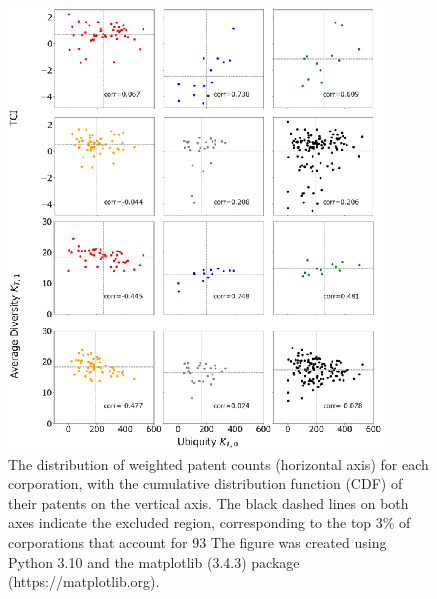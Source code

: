 \documentclass[fleqn,10pt]{wlscirep}
\begin{document}
\begin{figure}[ht]
    \centering
    \includegraphics[scale=0.75]{Figs/FigA1.eps}
    \caption{The distribution of weighted patent counts (horizontal axis) for each corporation, with the cumulative distribution function (CDF) of their patents on the vertical axis. The black dashed lines on both axes indicate the excluded region, corresponding to the top 3\% of corporations that account for 93%
    The figure was created using Python 3.10 and the matplotlib (3.4.3) package (https://matplotlib.org).}
    \label{fig:patentdistribution}
\end{figure}
\end{document}
